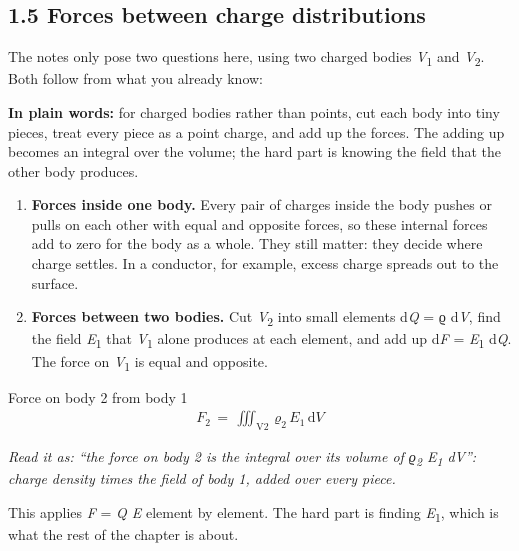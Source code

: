 \documentclass[11pt]{article}
\begin{document}
\begin{keepsection}
\section{1.5 Forces between charge distributions}

The notes only pose two questions here, using two charged bodies \textit{V}\textsubscript{1} and \textit{V}\textsubscript{2}. Both follow from what you already know:

\begin{plainbox}\textbf{In plain words:} for charged bodies rather than points, cut each body into tiny pieces, treat every piece as a point charge, and add up the forces. The adding up becomes an integral over the volume; the hard part is knowing the field that the other body produces.\end{plainbox}

\begin{enumerate}
\item \textbf{Forces inside one body.} Every pair of charges inside the body pushes or pulls on each other with equal and opposite forces, so these internal forces add to zero for the body as a whole. They still matter: they decide where charge settles. In a conductor, for example, excess charge spreads out to the surface.
\item \textbf{Forces between two bodies.} Cut \textit{V}\textsubscript{2} into small elements d\textit{Q} = ϱ d\textit{V}, find the field \textit{E}\textsubscript{1} that \textit{V}\textsubscript{1} alone produces at each element, and add up d\textit{F} = \textit{E}\textsubscript{1} d\textit{Q}. The force on \textit{V}\textsubscript{1} is equal and opposite.
\end{enumerate}

\begin{equationcard}{Force on body 2 from body 1}
\[ \begin{gathered} {F}_{2}\, =\, \iiint_{\mathrm{V}2} \, ϱ_{2}\, {E}_{1}\, \mathrm{d}{V} \end{gathered} \]
{\small \emph{Read it as: “the force on body 2 is the integral over its volume of ϱ\textsubscript{2} E\textsubscript{1} dV”: charge density times the field of body 1, added over every piece.}\par This applies \textit{F} = \textit{Q E} element by element. The hard part is finding \textit{E}\textsubscript{1}, which is what the rest of the chapter is about.}
\end{equationcard}


\end{keepsection}
\end{document}
